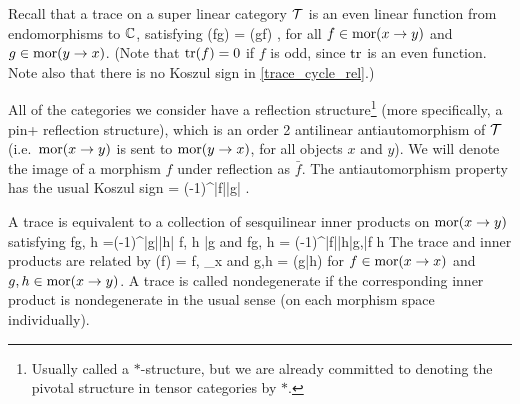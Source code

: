 Recall that a trace on a super linear category $\mathcal{T}$
is an even linear function from endomorphisms to $\mathbb{C}$, satisfying
\be  \label{trace_cycle_rel}
	\tr(fg) = \tr(gf) ,
\ee
for all $f \in \text{mor}(x\to y)$ and $g\in \text{mor}(y\to x)$.
(Note that $\text{tr}(f) = 0$ if $f$ is odd, since $\text{tr}$ is an even function.
Note also that there is no Koszul sign in \eqref{trace_cycle_rel}.)

All of the categories we consider have a reflection structure\footnote{Usually called a $*$-structure,
but we are already committed to denoting the pivotal structure in tensor categories by $*$.}
(more specifically, a pin+ reflection structure),
which is an order 2 antilinear antiautomorphism of $\mathcal{T}$
(i.e.\ $\text{mor}(x\to y)$ is sent to $\text{mor}(y\to x)$, for all objects $x$ and $y$).
We will denote the image of a morphism $f$ under reflection as $\bar f$.
The antiautomorphism property has the usual Koszul sign
\be
	 = (-1)^{|f||g|}   .
\ee

A trace is equivalent to a collection of sesquilinear inner products on $\text{mor}(x\to y)$ satisfying
\be
	\langle fg, h \rangle =(-1)^{|g||h|} \langle f, h \bar{g} \rangle \;\;\; {\rm and} \;\;\; \langle fg, h \rangle = (-1)^{|f||h|}\langle g,\bar{f}  h  \rangle 
\ee
The trace and inner products are related by
\be
\label{trace_to_innerproduct}
	\tr(f) = \langle f, \id_x \rangle   \;\;\; {\rm and} \;\;\;   \langle g,h \rangle = \tr(g\bar{h})
\ee
for $f\in\text{mor}(x\to x)$ and  $g,h\in\text{mor}(x\to y)$.
A trace is called nondegenerate if the corresponding inner product is nondegenerate in the usual sense (on each morphism space individually).

